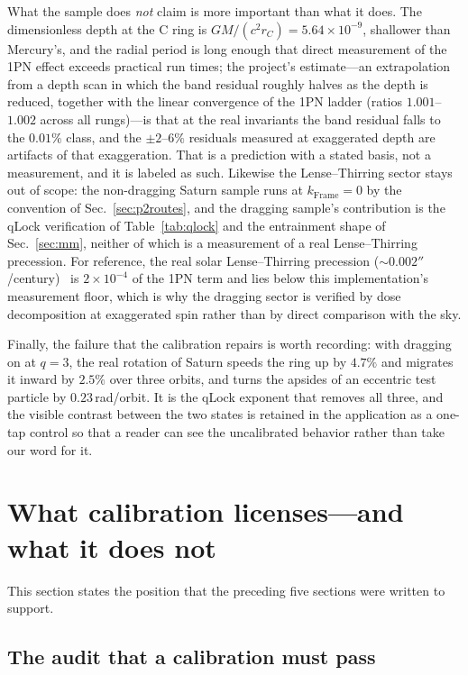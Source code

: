 \documentclass[aps,reprint,amsmath,amssymb,nofootinbib,superscriptaddress,floatfix]{revtex4-2}
\begin{document}
What the sample does \emph{not} claim is more important than what it
does.
The dimensionless depth at the C ring is
$GM/(c^{2}r_C)=5.64\times10^{-9}$, shallower than Mercury's, and the
radial period is long enough that direct measurement of the 1PN effect
exceeds practical run times; the project's estimate---an extrapolation
from a depth scan in which the band residual roughly halves as the
depth is reduced, together with the linear convergence of the 1PN
ladder (ratios $1.001$--$1.002$ across all rungs)---is that at the real
invariants the band residual falls to the $0.01\%$ class, and the
$\pm2$--$6\%$ residuals measured at exaggerated depth are artifacts of
that exaggeration.
That is a prediction with a stated basis, not a measurement, and it is
labeled as such.
Likewise the Lense--Thirring sector stays out of scope: the
non-dragging Saturn sample runs at $k_{\mathrm{Frame}}=0$ by the
convention of Sec.~\ref{sec:p2routes}, and the dragging sample's
contribution is the qLock verification of Table~\ref{tab:qlock} and the
entrainment shape of Sec.~\ref{sec:mm}, neither of which is a
measurement of a real Lense--Thirring precession.
For reference, the real solar Lense--Thirring precession
($\sim0.002''$/century)~\cite{IorioEtAl2011} is $2\times10^{-4}$ of the
1PN term and lies
below this implementation's measurement floor, which is why the
dragging sector is verified by dose decomposition at exaggerated spin
rather than by direct comparison with the sky.

Finally, the failure that the calibration repairs is worth recording:
with dragging on at $q=3$, the real rotation of Saturn speeds the ring
up by $4.7\%$ and migrates it inward by $2.5\%$ over three orbits, and
turns the apsides of an eccentric test particle by $0.23$\,rad/orbit.
It is the qLock exponent that removes all three, and the visible
contrast between the two states is retained in the application as a
one-tap control so that a reader can see the uncalibrated behavior
rather than take our word for it.

\section{What calibration licenses---and what it does not}
\label{sec:license}

This section states the position that the preceding five sections were
written to support.

\subsection{The audit that a calibration must pass}
\label{sec:audit}
\end{document}
